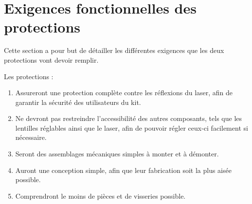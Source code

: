 \section{Exigences fonctionnelles des protections}
Cette section a pour but de détailler les différentes exigences que les deux protections vont devoir remplir.

Les protections :
\begin{enumerate}
    \item Assureront une protection complète contre les réflexions du laser, afin de garantir la sécurité des utilisateurs du kit.
    \item Ne devront pas restreindre l'accessibilité des autres composants, tels que les lentilles réglables ainsi que le laser, afin de pouvoir régler ceux-ci facilement si nécessaire.
    \item Seront des assemblages mécaniques simples à monter et à démonter.
    \item Auront une conception simple, afin que leur fabrication soit la plus aisée possible.
    \item Comprendront le moins de pièces et de visseries possible.
\end{enumerate}
\clearpage

